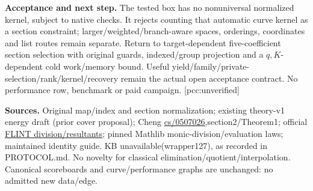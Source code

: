 \documentclass[10pt]{article}
\begin{document}
\textbf{Acceptance and next step.} The tested box has no nonuniversal
normalized kernel, subject to native checks. It rejects counting that
automatic curve kernel as a section constraint; larger/weighted/branch-aware
spaces, orderings, coordinates and list routes remain separate. Return to
target-dependent five-coefficient section selection with original guards,
indexed/group projection and a $q,K$-dependent cold work/memory bound.
Useful yield/family/private-selection/rank/kernel/recovery remain the actual
open acceptance contract. No performance row, benchmark or paid campaign.
[pcc:unverified]

\textbf{Sources.} Original map/index and section normalization; existing
theory-v1 energy draft (prior cover proposal); Cheng
\href{https://arxiv.org/pdf/cs/0507026}{cs/0507026},section2/Theorem1;
official \href{https://flintlib.org/doc/fmpz_mpoly/index.html}{FLINT division/resultants};
pinned Mathlib monic-division/evaluation laws; maintained identity guide.
KB unavailable(wrapper127), as recorded in PROTOCOL.md. No novelty for
classical elimination/quotient/interpolation. Canonical scoreboards and
curve/performance graphs are unchanged: no admitted new data/edge.
\end{document}
